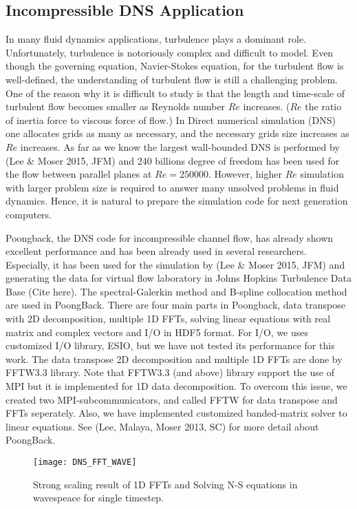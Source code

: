 \subsection{Incompressible DNS Application}
\label{sec:dns_full}

In many fluid dynamics applications, turbulence plays a
dominant role. Unfortunately, turbulence is 
notoriously complex and difficult to model. Even though the governing equation, Navier-Stokes equation, for the turbulent flow is well-defined, the understanding of turbulent flow is still a challenging problem. One of the reason why it is difficult to study is that the length and time-scale of turbulent flow becomes smaller as Reynolds number $Re$ increases. ($Re$ the ratio of inertia force to viscous force of flow.) In Direct numerical simulation (DNS) one allocates grids as many as necessary, and the necessary grids size increases as $Re$ increases. As far as we know the largest wall-bounded DNS is performed by (Lee \& Moser 2015, JFM) and 240 billions degree of freedom has been used for the flow between parallel planes at $Re = 250000$. However, higher $Re$ simulation with larger problem size is required to answer many unsolved problems in fluid dynamics. Hence, it is natural to prepare the simulation code for next generation computers.

Poongback, the DNS code for incompressible channel flow, has already shown excellent performance and has been already used in several researchers. Especially, it has been used for the simulation by (Lee \& Moser 2015, JFM) and generating the data for virtual flow laboratory in Johns Hopkins Turbulence Data Base (Cite here). The spectral-Galerkin method and B-spline collocation method are used in PoongBack. There are four main parts in Poongback, data transpose with 2D decomposition, multiple 1D FFTs, solving linear equations with real matrix and complex vectors and I/O in HDF5 format. For I/O, we uses customized I/O library, ESIO, but we have not tested its performance for this work. The data transpose 2D decomposition and multiple 1D FFTs are done by FFTW3.3 library. Note that FFTW3.3 (and above) library support the use of MPI but it is implemented for 1D data decomposition. To overcom this issue, we created two MPI-subcommunicators, and called FFTW for data transpose and FFTs seperately. Also, we have implemented customized banded-matrix solver to linear equations. See (Lee, Malaya, Moser 2013, SC) for more detail about PoongBack.

\begin{figure}[htb]
 \begin{center}
   \texttt{[image: DNS\_FFT\_WAVE]}
   \caption{Strong scaling result of 1D FFTs and Solving N-S equations in wavespeace for single timestep.}
   \label{fig:DNS_strong_scale_fft_wave}
 \end{center}
\end{figure}

